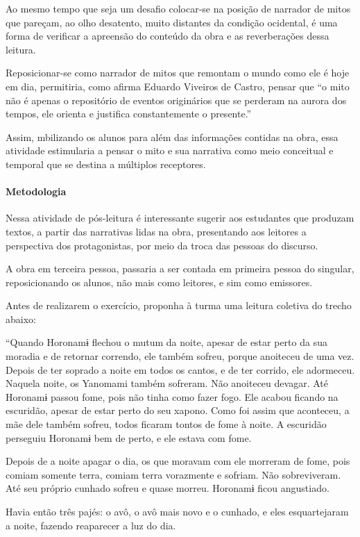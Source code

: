 \documentclass[12pt]{extarticle}
\begin{document}
Ao mesmo tempo que seja um desafio colocar-se na posição de narrador de mitos que 
pareçam, ao olho desatento, muito distantes da condição ocidental, é uma forma de 
verificar a apreensão do conteúdo da obra e as reverberações dessa leitura. 

Reposicionar-se como narrador de mitos que remontam o mundo como ele é hoje em dia, 
permitiria, como afirma Eduardo Viveiros de Castro, pensar que ``o mito não é apenas 
o repositório de eventos originários que se perderam na aurora dos tempos, ele orienta 
e justifica constantemente o presente.'' 

Assim, mbilizando os alunos para além das informações contidas na obra, essa atividade 
estimularia a pensar o mito e sua narrativa como meio conceitual e temporal que se destina
a múltiplos receptores.

\paragraph{Metodologia}

Nessa atividade de pós-leitura é interessante sugerir aos estudantes que
produzam textos, a partir das narrativas lidas na obra, presentando aos leitores a 
perspectiva dos protagonistas, por meio da troca das pessoas do discurso.

A obra em terceira pessoa, passaria a ser contada em primeira pessoa do singular,
reposicionando os alunos, não mais como leitores, e sim como emissores.

Antes de realizarem o exercício, proponha à turma uma leitura coletiva do trecho abaixo:

``Quando Horonamɨ flechou o mutum da noite, apesar de estar perto da sua moradia e de retornar 
correndo, ele também sofreu, porque anoiteceu de uma vez. Depois de ter soprado a noite em todos
os cantos, e de ter corrido, ele adormeceu. Naquela noite, os Yanomami também sofreram. Não anoiteceu
devagar. Até Horonamɨ passou fome, pois não tinha como fazer fogo. Ele acabou ficando na escuridão, 
apesar de estar perto do seu xapono. Como foi assim que aconteceu, a mãe dele também sofreu, todos 
ficaram tontos de fome à noite. A escuridão perseguiu Horonamɨ bem de perto, e ele estava com fome.

Depois de a noite apagar o dia, os que moravam com ele morreram de fome, pois comiam somente terra,
comiam terra vorazmente e sofriam. Não sobreviveram. Até seu próprio cunhado sofreu e quase morreu. 
Horonamɨ ficou angustiado.

Havia então três pajés: o avô, o avô mais novo e o cunhado, e eles esquartejaram a noite, fazendo 
reaparecer a luz do dia.
\end{document}
